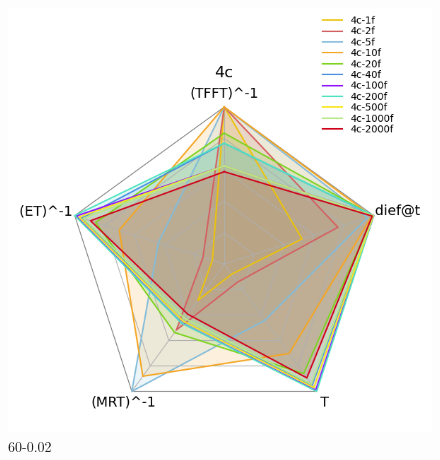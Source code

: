\documentclass[12pt,a4paper]{article}
\begin{document}
\begin{figure}[H]
{\begin{minipage}{0.5\textwidth}
            \includegraphics[scale=0.6]{../processed/NRT/small/checks/60-0.02/fixedcores/4c/plots/radar-dieft.png}
            \caption*{60-0.02}
        \end{minipage}
    }
    
    \vspace{0.5cm} %



\end{figure}
\end{document}
